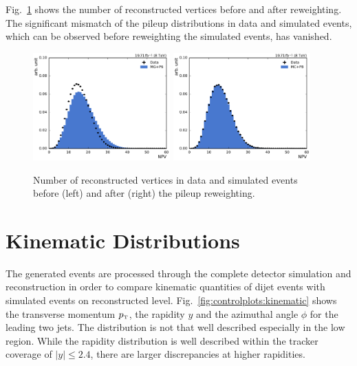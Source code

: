 Fig.~\ref{fig:mc:npv_reweighting} shows the number of reconstructed vertices
before and after reweighting. The significant mismatch of the
pileup distributions in data and simulated events, which can be observed before
reweighting the simulated events, has vanished.

\begin{figure}[htbp]
    \centering
    \includegraphics[width=0.47\textwidth]{figures/measurement/npv_beforereweighting.pdf}\hfill
    \includegraphics[width=0.47\textwidth]{figures/measurement/npv_afterreweighting.pdf}
    \caption[Number of reconstructed vertices]{Number of reconstructed vertices in data and simulated events before
    (left) and after (right) the pileup reweighting.}
    \label{fig:mc:npv_reweighting}
\end{figure}

\section{Kinematic Distributions}

The generated events are processed through the complete detector simulation and
reconstruction in order to compare kinematic quantities of dijet events with
simulated events on reconstructed level. Fig.~\ref{fig:controlplots:kinematic}
shows the transverse momentum $\pt$, the rapidity $y$ and the azimuthal angle
$\phi$ for the leading two jets. The \pt distribution is not that well described
especially in the low \pt region. While the rapidity distribution is well
described within the tracker coverage of $|y| \leq 2.4$, there are larger
discrepancies at higher rapidities.

